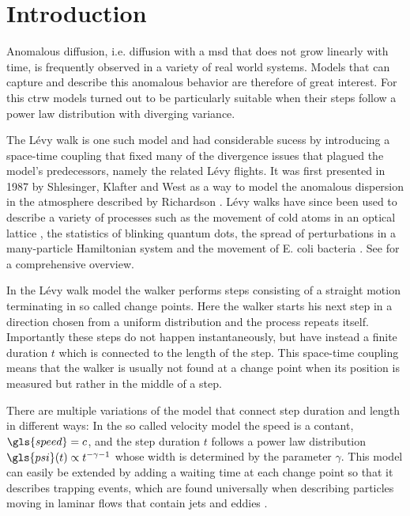 \chapter{Introduction}

Anomalous diffusion, i.e. diffusion with a \gls{msd} that does not grow linearly with time, is frequently observed in a variety of real world systems.
Models that can capture and describe this anomalous behavior are therefore of great interest. For this \gls{ctrw} models turned out to be particularly suitable when their steps follow a power law distribution with diverging variance. 

The L\'evy walk is one such model and had considerable sucess by introducing a space-time coupling that fixed many of the divergence issues that plagued the model's predecessors, namely the related L\'evy flights. It was first presented in 1987 by Shlesinger, Klafter and West \cite{shlesinger1987} as a way to model the anomalous dispersion in the atmosphere described by Richardson \cite{richardson}. L\'evy walks have since been used to describe a variety of processes such as the movement of cold atoms in an optical lattice \cite{marksteiner1996},  the statistics of blinking quantum dots, the spread of perturbations in a many-particle Hamiltonian system \cite{zaburdaev2011perturbation} and the movement of E. coli bacteria \cite{korobkova2004}. See \cite{lwreview} for a comprehensive overview. 

In the L\'evy walk model the walker performs steps consisting of a straight motion terminating in so called change points. Here the walker starts his next step in a direction chosen from a uniform distribution and the process repeats itself. Importantly these steps do not happen instantaneously, but have instead a finite duration $t$ which is connected to the length of the step. This space-time coupling means that the walker is usually not found at a change point  when its position is measured but rather in the middle of a step. 

There are multiple variations of the model that connect step duration and length in different ways: In the so called velocity model the speed is a contant, $\gls{speed} = c$, and the step duration $t$ follows a power law distribution $\gls{psi}(t) \propto t^{-\gamma -1 }$ whose width is determined by the parameter $\gamma$. This model can easily be extended by adding a waiting time at each change point so that it describes trapping events, which are found universally when describing particles moving in laminar flows that contain jets and eddies \cite{solomon1993,solomon1994,poschke2017}.

